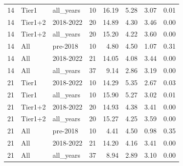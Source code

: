 \begin{table}
\begin{tabular}{rllrrrrr}
14 & Tier1 & all\_years & 10 & 16.19 & 5.28 & 3.07 & 0.01 \\
14 & Tier1+2 & 2018-2022 & 20 & 14.89 & 4.30 & 3.46 & 0.00 \\
14 & Tier1+2 & all\_years & 20 & 15.20 & 4.22 & 3.60 & 0.00 \\
14 & All & pre-2018 & 10 & 4.80 & 4.50 & 1.07 & 0.31 \\
14 & All & 2018-2022 & 21 & 14.05 & 4.08 & 3.44 & 0.00 \\
14 & All & all\_years & 37 & 9.14 & 2.86 & 3.19 & 0.00 \\
21 & Tier1 & 2018-2022 & 10 & 14.29 & 5.35 & 2.67 & 0.03 \\
21 & Tier1 & all\_years & 10 & 15.90 & 5.27 & 3.02 & 0.01 \\
21 & Tier1+2 & 2018-2022 & 20 & 14.93 & 4.38 & 3.41 & 0.00 \\
21 & Tier1+2 & all\_years & 20 & 15.27 & 4.25 & 3.59 & 0.00 \\
21 & All & pre-2018 & 10 & 4.41 & 4.50 & 0.98 & 0.35 \\
21 & All & 2018-2022 & 21 & 14.20 & 4.16 & 3.41 & 0.00 \\
21 & All & all\_years & 37 & 8.94 & 2.89 & 3.10 & 0.00 \\
\bottomrule
\end{tabular}
\end{table}
